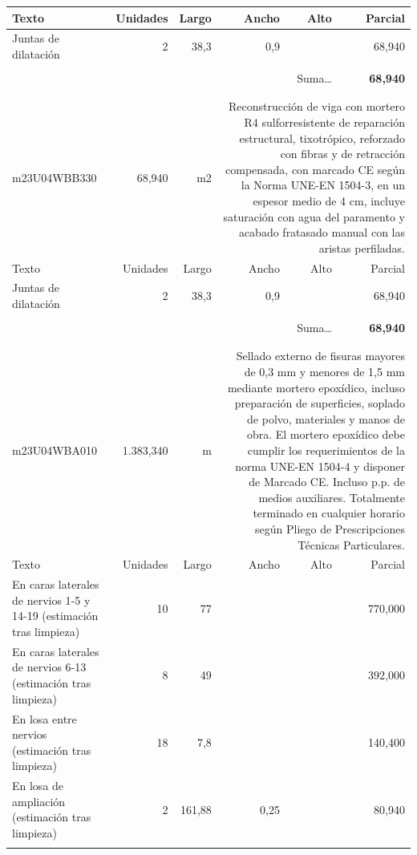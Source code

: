 \documentclass{book}%
\begin{document}
\begin{longtable}{lrrrrr}
Texto&Unidades&Largo&Ancho&Alto&Parcial\\%
\hline%
\multicolumn{1}{p{3.5cm}}{Juntas de dilatación}&2&38,3&0,9&&    68,940\\%
&&&&&\\%
\multicolumn{5}{r}{Suma\ldots}&\textbf{    68,940}\\%
\hline%
&&&&&\\%
&&&&&\\%
m23U04WBB330&    68,940& m2&\multicolumn{3}{p{6cm}}{\scriptsize Reconstrucción de viga con mortero R4 sulforresistente de reparación estructural, tixotrópico, reforzado con fibras y de retracción compensada, con marcado CE según la Norma UNE-EN 1504-3, en un espesor medio de 4 cm, incluye saturación con agua del paramento y acabado fratasado manual con las aristas perfiladas.\normalsize}\\%
Texto&Unidades&Largo&Ancho&Alto&Parcial\\%
\hline%
\multicolumn{1}{p{3.5cm}}{Juntas de dilatación}&2&38,3&0,9&&    68,940\\%
&&&&&\\%
\multicolumn{5}{r}{Suma\ldots}&\textbf{    68,940}\\%
\hline%
&&&&&\\%
&&&&&\\%
m23U04WBA010& 1.383,340& m&\multicolumn{3}{p{6cm}}{\scriptsize Sellado externo de fisuras mayores de 0,3 mm y menores de 1,5 mm mediante mortero epoxídico, incluso preparación de superficies, soplado de polvo, materiales y manos de obra. El mortero epoxídico debe cumplir los requerimientos de la norma UNE-EN 1504-4 y disponer de Marcado CE. Incluso p.p. de medios auxiliares. Totalmente terminado en cualquier horario según Pliego de Prescripciones Técnicas Particulares.\normalsize}\\%
Texto&Unidades&Largo&Ancho&Alto&Parcial\\%
\hline%
\multicolumn{1}{p{3.5cm}}{En caras laterales de nervios 1{-}5 y 14{-}19 (estimación tras limpieza)}&10&77&&&   770,000\\%
\multicolumn{1}{p{3.5cm}}{En caras laterales de nervios 6{-}13 (estimación tras limpieza)}&8&49&&&   392,000\\%
\multicolumn{1}{p{3.5cm}}{En losa entre nervios (estimación tras limpieza)}&18&7,8&&&   140,400\\%
\multicolumn{1}{p{3.5cm}}{En losa de ampliación (estimación tras limpieza)}&2&161,88&0,25&&    80,940\\%
&&&&&\\%

\end{longtable}
\end{document}
